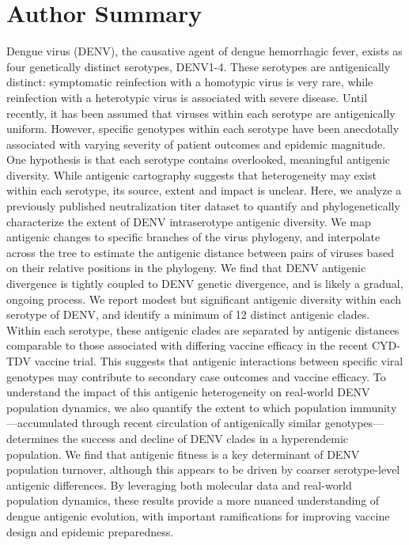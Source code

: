 \documentclass[11pt,oneside,letterpaper]{article}
\begin{document}
\section*{Author Summary}
Dengue virus (DENV), the causative agent of dengue hemorrhagic fever, exists as four genetically distinct serotypes, DENV1-4.
These serotypes are antigenically distinct: symptomatic reinfection with a homotypic virus is very rare, while reinfection with a heterotypic virus is associated with severe disease.
Until recently, it has been assumed that viruses within each serotype are antigenically uniform.
However, specific genotypes within each serotype have been anecdotally associated with varying severity of patient outcomes and epidemic magnitude.
One hypothesis is that each serotype contains overlooked, meaningful antigenic diversity.
While antigenic cartography suggests that heterogeneity may exist within each serotype, its source, extent and impact is unclear.
Here, we analyze a previously published neutralization titer dataset to quantify and phylogenetically characterize the extent of DENV intraserotype antigenic diversity.
We map antigenic changes to specific branches of the virus phylogeny, and interpolate across the tree to estimate the antigenic distance between pairs of viruses based on their relative positions in the phylogeny.
We find that DENV antigenic divergence is tightly coupled to DENV genetic divergence, and is likely a gradual, ongoing process.
We report modest but significant antigenic diversity within each serotype of DENV, and identify a minimum of 12 distinct antigenic clades.
Within each serotype, these antigenic clades are separated by antigenic distances comparable to those associated with differing vaccine efficacy in the recent CYD-TDV vaccine trial.
This suggests that antigenic interactions between specific viral genotypes may contribute to secondary case outcomes and vaccine efficacy.
To understand the impact of this antigenic heterogeneity on real-world DENV population dynamics, we also quantify the extent to which population immunity---accumulated through recent circulation of antigenically similar genotypes---determines the success and decline of DENV clades in a hyperendemic population.
We find that antigenic fitness is a key determinant of DENV population turnover, although this appears to be driven by coarser serotype-level antigenic differences.
By leveraging both molecular data and real-world population dynamics, these results provide a more nuanced understanding of dengue antigenic evolution, with important ramifications for improving vaccine design and epidemic preparedness.
\end{document}
